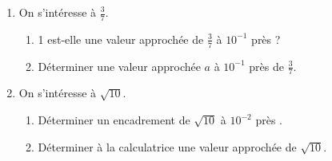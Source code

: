 
\begin{enumerate}
\item On s'intéresse à $\frac{3}{7}$.
\begin{enumerate}
	\item 1 est-elle une valeur approchée de $\frac{3}{7}$ à $ 10^{-1}$ près ?
	\item Déterminer une valeur approchée $a$ à $ 10^{-1}$ près de $\frac{3}{7}$.	
\end{enumerate}

\item
On s'intéresse à $\sqrt{10}$.
\begin{enumerate}
	\item Déterminer un encadrement de $\sqrt{10}$ à $ 10^{-2}$ près .
	\item Déterminer à la calculatrice  une valeur approchée de  $\sqrt{10}$.	
\end{enumerate}
\end{enumerate}
 